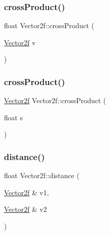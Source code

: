 \mbox{\label{class_vector2f_a388d18e14a48e7db6e62c7aef50548c5}} 
\subsubsection{\texorpdfstring{crossProduct()}{crossProduct()}\hspace{0.1cm}{\footnotesize\ttfamily [1/2]}}
{\footnotesize\ttfamily float Vector2f\+::cross\+Product (\begin{DoxyParamCaption}\item[{\mbox{\hyperlink{class_vector2f}{Vector2f}}}]{v }\end{DoxyParamCaption})}

\mbox{\label{class_vector2f_a5f463c9fd9bba6bfe9b2c83aeeb887cc}} 
\subsubsection{\texorpdfstring{crossProduct()}{crossProduct()}\hspace{0.1cm}{\footnotesize\ttfamily [2/2]}}
{\footnotesize\ttfamily \mbox{\hyperlink{class_vector2f}{Vector2f}} Vector2f\+::cross\+Product (\begin{DoxyParamCaption}\item[{float}]{s }\end{DoxyParamCaption})}

\mbox{\label{class_vector2f_a74913cfbfcd4e602b78cac43352d5e05}} 
\subsubsection{\texorpdfstring{distance()}{distance()}\hspace{0.1cm}{\footnotesize\ttfamily [1/2]}}
{\footnotesize\ttfamily float Vector2f\+::distance (\begin{DoxyParamCaption}\item[{\mbox{\hyperlink{class_vector2f}{Vector2f}} \&}]{v1,  }\item[{\mbox{\hyperlink{class_vector2f}{Vector2f}} \&}]{v2 }\end{DoxyParamCaption})}

